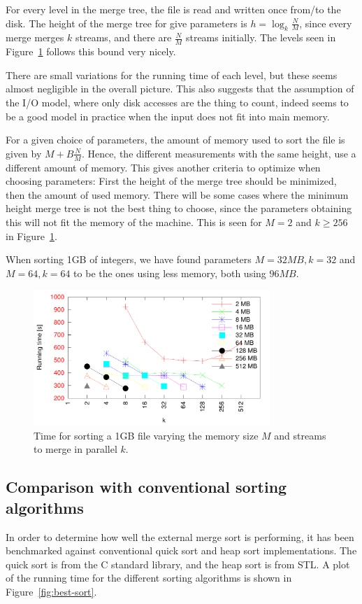 \documentclass[a4paper,12pt]{article}
\begin{document}
For every level in the merge tree, the file is read and written once
from/to the disk. The height of the merge tree for give parameters is
$h = \log_k \frac{N}{M}$, since every merge merges $k$ streams, and
there are $\frac{N}{M}$ streams initially. The levels seen in
Figure~\ref{fig:sorting} follows this bound very nicely.

There are small variations for the running time of each level, but
these seems almost negligible in the overall picture. This also
suggests that the assumption of the I/O model, where only disk
accesses are the thing to count, indeed seems to be a good model in
practice when the input does not fit into main memory.

For a given choice of parameters, the amount of memory used to sort
the file is given by $M + B\frac{N}{M}$. Hence, the different
measurements with the same height, use a different amount of
memory. This gives another criteria to optimize when choosing
parameters: First the height of the merge tree should be minimized,
then the amount of used memory. There will be some cases where the
minimum height merge tree is not the best thing to choose, since the
parameters obtaining this will not fit the memory of the machine. This
is seen for $M = 2$ and $k \geq 256$ in Figure~\ref{fig:sorting}.

When sorting 1GB of integers, we have found parameters $M = 32MB, k =
32$ and $M = 64, k = 64$ to be the ones using less memory, both using $96MB$.

\begin{figure}[h!]
  \centering
  \includegraphics[width=0.8\textwidth]{sorting2}
  \caption{Time for sorting a 1GB file varying the memory size $M$ and
    streams to merge in parallel $k$.}
  \label{fig:sorting}
\end{figure}

\subsection{Comparison with conventional sorting algorithms}
In order to determine how well the external merge sort is performing,
it has been benchmarked against conventional quick sort and heap sort
implementations. The quick sort is from the C standard library, and
the heap sort is from STL. A plot of the running time for the
different sorting algorithms is shown in Figure~\ref{fig:best-sort}.
\end{document}
